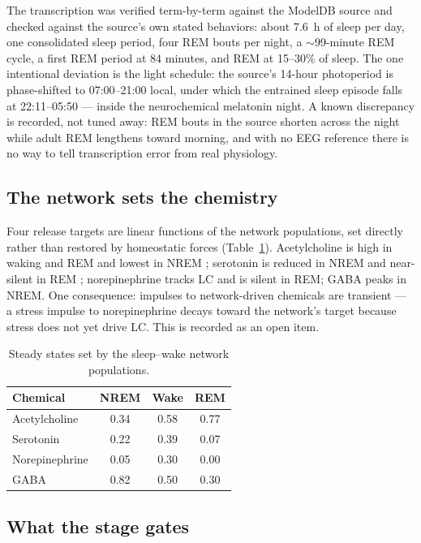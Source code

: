 \documentclass[11pt]{article}
\begin{document}
The transcription was verified term-by-term against the ModelDB source
and checked against the source's own stated behaviors: about 7.6~h of
sleep per day, one consolidated sleep period, four REM bouts per night,
a $\sim$99-minute REM cycle, a first REM period at 84 minutes, and REM
at 15--30\% of sleep. The one intentional deviation is the light
schedule: the source's 14-hour photoperiod is phase-shifted to
07:00--21:00 local, under which the entrained sleep episode falls at
22:11--05:50 --- inside the neurochemical melatonin night. A known
discrepancy is recorded, not tuned away: REM bouts in the source
shorten across the night while adult REM lengthens toward morning, and
with no EEG reference there is no way to tell transcription error from
real physiology.

\subsection{The network sets the chemistry}

Four release targets are linear functions of the network populations,
set directly rather than restored by homeostatic forces
(Table~\ref{tab:sleepchem}). Acetylcholine is high in waking and REM
and lowest in NREM \cite{vazquez}; serotonin is reduced in NREM and near-silent in
REM \cite{monti}; norepinephrine tracks LC and is silent in REM; GABA peaks in NREM.
One consequence: impulses to network-driven chemicals are transient ---
a stress impulse to norepinephrine decays toward the network's target
because stress does not yet drive LC. This is recorded as an open item.

\begin{table}[h]
\centering
\begin{tabular}{@{}lccc@{}}
\toprule
Chemical & NREM & Wake & REM \\
\midrule
Acetylcholine   & 0.34 & 0.58 & 0.77 \\
Serotonin       & 0.22 & 0.39 & 0.07 \\
Norepinephrine  & 0.05 & 0.30 & 0.00 \\
GABA            & 0.82 & 0.50 & 0.30 \\
\bottomrule
\end{tabular}
\caption{Steady states set by the sleep--wake network populations.}
\label{tab:sleepchem}
\end{table}

\subsection{What the stage gates}
\end{document}
